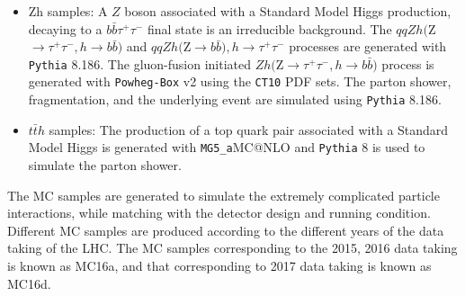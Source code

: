 \begin{itemize}
    \item Zh samples: A $Z$ boson associated with a Standard Model Higgs production, decaying to a 
    $b\bar{b}\tau^+\tau^-$ final state is an irreducible background. 
    The $qqZh($Z$\rightarrow \tau^+\tau^-, h \rightarrow b\bar{b})$ 
    and $qqZh($Z$\rightarrow b\bar{b}), h \rightarrow \tau^+\tau^-$ processes 
    are generated with {\tt Pythia} 8.186\cite{Sjostrand:2006za}. The gluon-fusion 
    initiated $Zh($Z$\rightarrow\tau^+\tau^-, h\rightarrow b\bar{b})$ process is 
    generated with {\tt Powheg-Box} v2\cite{NLOpowheg} using the {\tt CT10} PDF sets\cite{Lai:2010vv}. 
    The parton shower, fragmentation, and the underlying event are simulated using {\tt Pythia} 8.186. 
    \item $t\bar{t}h$ samples: The production of a top quark pair associated with a Standard Model 
    Higgs is generated with {\tt MG5\_a}MC@NLO and {\tt Pythia} 8 is used to simulate the parton shower.
 \end{itemize}
 
The MC samples are generated to simulate the extremely complicated 
particle interactions, while matching with the detector design and running condition. 
Different MC samples are produced according to the different years of the data taking of the LHC. 
The MC samples corresponding to the 2015, 2016 data taking is known as MC16a, and that corresponding to 2017 data taking is known as MC16d.



